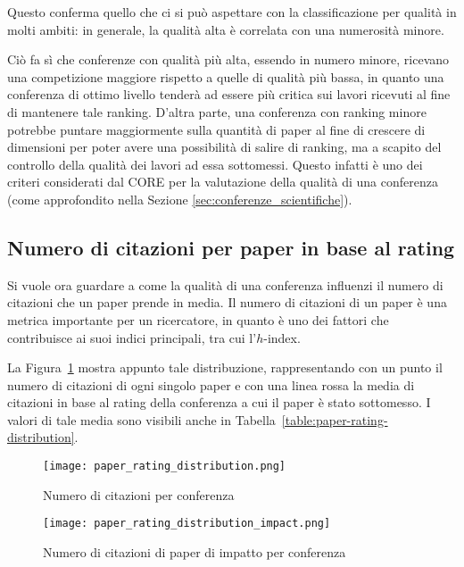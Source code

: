 Questo conferma quello che ci si può aspettare con la classificazione per qualità in molti ambiti: in generale, la qualità alta è correlata
con una numerosità minore.

Ciò fa sì che conferenze con qualità più alta, essendo in numero minore,
ricevano una competizione maggiore rispetto a quelle di qualità più bassa, in
quanto una conferenza di ottimo livello tenderà ad essere più critica sui lavori
ricevuti al fine di mantenere tale ranking. D'altra parte, una conferenza con
ranking minore potrebbe puntare maggiormente sulla quantità di paper al fine di
crescere di dimensioni per poter avere una possibilità di salire di ranking,
ma a scapito del controllo della qualità dei lavori ad essa sottomessi. Questo infatti è uno dei criteri considerati dal CORE per la valutazione della qualità di una conferenza (come approfondito nella Sezione \ref{sec:conferenze_scientifiche}).

\subsection{Numero di citazioni per paper in base al rating}

Si vuole ora guardare a come la qualità di una conferenza influenzi il numero
di citazioni che un paper prende in media. Il numero di citazioni di un paper
è una metrica importante per un ricercatore, in quanto è uno dei fattori
che contribuisce ai suoi indici principali, tra cui l'$h$-index.

La Figura~\ref{fig:paper-rating-distribution} mostra appunto tale distribuzione,
rappresentando con un punto il numero di citazioni di ogni singolo paper e
con una linea rossa la media di citazioni in base al rating della conferenza
a cui il paper è stato sottomesso. I valori di tale media sono visibili
anche in Tabella~\ref{table:paper-rating-distribution}.

\begin{figure}[tb]
  \centering
  \texttt{[image: paper\_rating\_distribution.png]}
  \caption{Numero di citazioni per conferenza}
  \label{fig:paper-rating-distribution}
\end{figure}

\begin{figure}[tb]
  \centering
  \texttt{[image: paper\_rating\_distribution\_impact.png]}
  \caption{Numero di citazioni di paper di impatto per conferenza}
  \label{fig:paper-rating-distribution-impact}
\end{figure}

